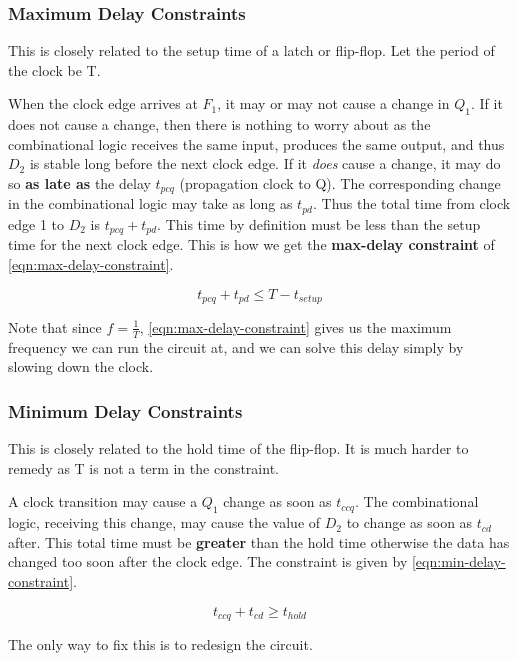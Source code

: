 \documentclass[11pt]{report}
\begin{document}
\subsubsection{Maximum Delay Constraints}
This is closely related to the setup time of a latch or flip-flop. Let the period of the clock be T.

When the clock edge arrives at $F_1$, it may or may not cause a change in $Q_1$. If it does not cause a change, then there is nothing to worry about as the combinational logic receives the same input, produces the same output, and thus $D_2$ is stable long before the next clock edge. If it \textit{does} cause a change, it may do so \textbf{as late as} the delay $t_{pcq}$ (propagation clock to Q). The corresponding change in the combinational logic may take as long as $t_{pd}$. Thus the total time from clock edge 1 to $D_2$ is $t_{pcq} + t_{pd}$. This time by definition must be less than the setup time for the next clock edge. This is how we get the \textbf{max-delay constraint} of \autoref{eqn:max-delay-constraint}.

\begin{equation}
	\label{eqn:max-delay-constraint}
	t_{pcq} + t_{pd} \le T - t_{setup}
\end{equation}

Note that since $f = \frac{1}{T}$, \autoref{eqn:max-delay-constraint} gives us the maximum frequency we can run the circuit at, and we can solve this delay simply by slowing down the clock.

\subsubsection{Minimum Delay Constraints}
This is closely related to the hold time of the flip-flop. It is much harder to remedy as T is not a term in the constraint.

A clock transition may cause a $Q_1$ change as soon as $t_{ccq}$. The combinational logic, receiving this change, may cause the value of $D_2$ to change as soon as $t_{cd}$ after. This total time must be \textbf{greater} than the hold time otherwise the data has changed too soon after the clock edge. The constraint is given by \autoref{eqn:min-delay-constraint}.

\begin{equation}
	\label{eqn:min-delay-constraint}
	t_{ccq} + t_{cd} \geq t_{hold}
\end{equation}

The only way to fix this is to redesign the circuit.
\end{document}
